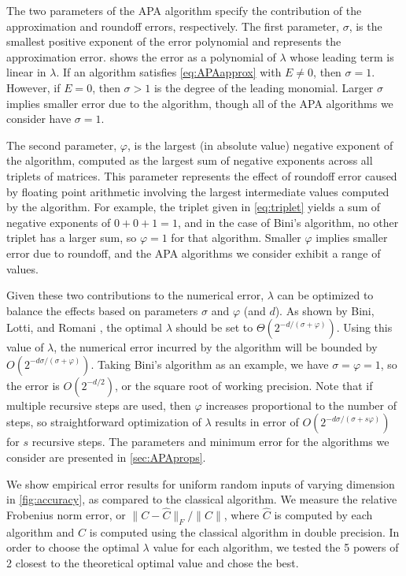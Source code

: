 \documentclass[sigconf,review,anonymous]{acmart}
\begin{document}
The two parameters of the APA algorithm specify the contribution of the approximation and roundoff errors, respectively.
The first parameter, $\sigma$, is the smallest positive exponent of the error polynomial and represents the approximation error.
 shows the error as a polynomial of $\lambda$ whose leading term is linear in $\lambda$.
If an algorithm satisfies \cref{eq:APAapprox} with $E\neq 0$, then $\sigma=1$.
However, if $E=0$, then $\sigma>1$ is the degree of the leading monomial.
Larger $\sigma$ implies smaller error due to the algorithm, though all of the APA algorithms we consider have $\sigma=1$.

The second parameter, $\varphi$, is the largest (in absolute value) negative exponent of the algorithm, computed as the largest sum of negative exponents across all triplets of matrices.
This parameter represents the effect of roundoff error caused by floating point arithmetic involving the largest intermediate values computed by the algorithm.
For example, the triplet given in \cref{eq:triplet} yields a sum of negative exponents of $0+0+1=1$, and in the case of Bini's algorithm, no other triplet has a larger sum, so $\varphi=1$ for that algorithm.
Smaller $\varphi$ implies smaller error due to roundoff, and the APA algorithms we consider exhibit a range of values.

Given these two contributions to the numerical error, $\lambda$ can be optimized to balance the effects based on parameters $\sigma$ and $\varphi$ (and $d$).
As shown by Bini, Lotti, and Romani \cite{BLR80}, the optimal $\lambda$ should be set to $\Theta(2^{-d/(\sigma+\varphi)})$.
Using this value of $\lambda$, the numerical error incurred by the algorithm will be bounded by $O(2^{-d\sigma/(\sigma+\varphi)})$.
Taking Bini's algorithm as an example, we have $\sigma=\varphi=1$, so the error is $O(2^{-d/2})$, or the square root of working precision.
Note that if multiple recursive steps are used, then $\varphi$ increases proportional to the number of steps, so straightforward optimization of $\lambda$ results in error of $O(2^{-d\sigma/(\sigma+s\varphi)})$ for $s$ recursive steps.
The parameters and minimum error for the algorithms we consider are presented in \cref{sec:APAprops}.

We show empirical error results for uniform random inputs of varying dimension in \cref{fig:accuracy}, as compared to the classical algorithm.
We measure the relative Frobenius norm error, or $\|C-\hat C\|_F/\|C\|$, where $\hat C$ is computed by each algorithm and $C$ is computed using the classical algorithm in double precision.
In order to choose the optimal $\lambda$ value for each algorithm, we tested the 5 powers of 2 closest to the theoretical optimal value and chose the best.
\end{document}

